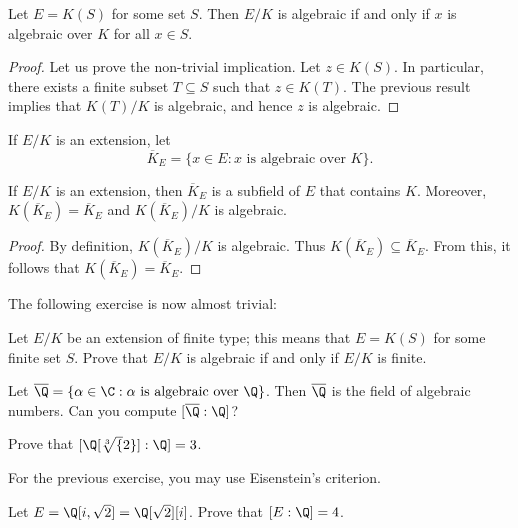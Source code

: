 \begin{corollary}
\label{cor:finite type algebraic}
	Let $E=K(S)$ for some set $S$. Then $E/K$ is algebraic if and only if
	$x$ is algebraic over $K$ for all $x\in S$. 
\end{corollary}

\begin{proof}
	Let us prove the non-trivial implication. Let $z\in K(S)$. In particular, 
	there exists a finite subset $T\subseteq S$ such that 
	$z\in K(T)$. The previous result implies that $K(T)/K$ is algebraic, and
	hence $z$ is algebraic. 
\end{proof}

If $E/K$ is an extension, let 
\[
	\overline{K}_E=\{x\in E:x\text{ is algebraic over }K\}. 
\]

\begin{corollary}
	If $E/K$ is  an extension, then $\overline{K}_E$ 
	is a subfield of $E$ that contains $K$. Moreover, 
	$K(\overline{K}_E)=\overline{K}_E$ and 
        $K(\overline{K}_E)/K$ is algebraic. 
\end{corollary}	

\begin{proof}
    By definition, $K(\overline{K}_E)/K$ is algebraic. 
    Thus $K(\overline{K}_E)\subseteq\overline{K}_E$. From this, it follows that
    $K(\overline{K}_E)=\overline{K}_E$. 
\end{proof}

The following exercise is now almost trivial:

\begin{exercise}
\label{xca:finite type}
    Let $E/K$ be an extension of finite type; this means 
    that  
    $E=K(S)$ for some finite
    set $S$.  
    Prove that $E/K$ is algebraic if and only if $E/K$ 
    is finite. 
\end{exercise}

Let $\overline{\Q}=\{\alpha\in\C:\alpha\text{ is algebraic over }\Q\}$. 
Then $\overline{\Q}$ is the field of algebraic numbers. 
Can you compute $[\overline{\Q}:\Q]$?

\begin{exercise}
\label{xca:degree of sqrt[3]2}
    Prove that $[\Q[\sqrt[3]{2}]:\Q]=3$. 
\end{exercise}

For the previous exercise, you may use Eisenstein's criterion. 

\begin{exercise}
\label{xca:Q(i,sqrt2)}
    Let $E=\Q[i,\sqrt{2}]=\Q[\sqrt{2}][i]$. Prove that $[E:\Q]=4$.  
\end{exercise}

